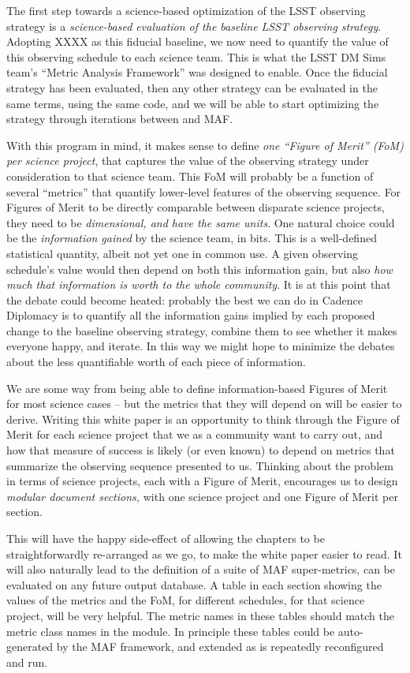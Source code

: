 The first step towards a science-based optimization of the LSST
observing strategy is a {\it science-based evaluation of the baseline
LSST observing strategy}. Adopting XXXX as this fiducial baseline, we
now need to quantify the value of this observing schedule to each
science team. This is what the LSST DM Sims team's ``Metric Analysis
Framework''  was designed to enable. Once the fiducial strategy has
been evaluated, then any other strategy can be evaluated in the same
terms, using the same code, and we will be able to start optimizing
the strategy through iterations between \OpSim and MAF.

With this program in mind, it makes sense to define {\it one ``Figure
of Merit'' (FoM) per science project}, that captures the value of  the
observing strategy under consideration to that science team. This FoM
will probably be a function of several ``metrics'' that quantify
lower-level features of the observing sequence.  For Figures of Merit
to be directly comparable between disparate science projects,  they
need to be {\it dimensional, and have the same units}. One natural
choice could be the {\it information gained} by the science team, in
bits. This is a well-defined statistical quantity, albeit not yet one
in common use. A given observing schedule's value would then depend on
both this information gain, but also {\it how much that information is
worth to the whole community}. It is at this point that the debate
could become heated: probably the best we can do in Cadence Diplomacy
is to quantify all the information gains implied by each proposed
change to the baseline  observing strategy, combine them to see
whether it makes everyone happy, and iterate. In this way we might
hope to minimize the debates about the less quantifiable worth of each
piece of information.

We are some way from being able to define information-based Figures of
Merit for most science cases -- but the metrics that they will depend
on will be easier to derive. Writing this white paper is an
opportunity to think through the Figure of Merit for each science
project that we as a community want to carry out, and how that measure
of success is likely (or even known) to depend on metrics that
summarize the observing sequence presented to us. Thinking about the
problem in terms of science projects, each with a  Figure of Merit,
encourages us to design {\it modular document
sections,} with one science project and one Figure of Merit per section.

This will have the happy side-effect of allowing the chapters to be
straightforwardly re-arranged as we go, to make the white paper easier
to read. It will also naturally lead to the definition of a suite of
MAF  super-metrics, can be evaluated on any future \OpSim output
database.  A table in each section showing the values of the metrics
and the FoM, for different schedules, for that science project, will
be very helpful. The metric names in these tables should match the
metric class names in the
\href{https://github.com/LSST-nonproject/sims_maf_contrib/wiki}{\simsMafContrib}
module. In principle these tables could be auto-generated by the MAF
framework, and extended as \OpSim is repeatedly reconfigured and run.

